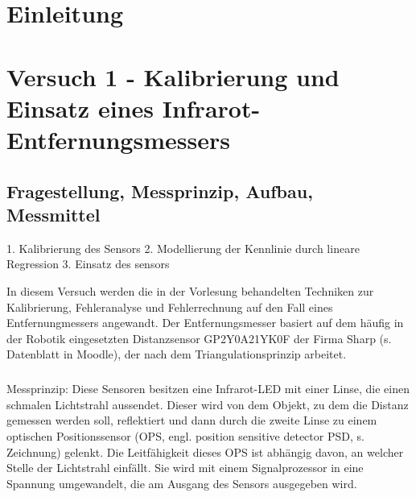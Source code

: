 \documentclass[12pt,oneside,a4paper]{report}
\begin{document}




\clearpage

%
%


%
%


%
%


%
%




\setcounter{page}{1}
%
%
\chapter{Einleitung}
\label{chap:EINL}

\cite{Franz2015j}

%
%
\chapter{Versuch 1 - Kalibrierung und Einsatz eines
Infrarot-Entfernungsmessers}
\label{chap:VERSUCH_1}

\section{Fragestellung, Messprinzip, Aufbau, Messmittel}
\label{chap:VERSUCH_1_FRAGESTELLUNG}

1.  Kalibrierung des Sensors
2. Modellierung der Kennlinie durch lineare Regression
3. Einsatz des sensors

In diesem Versuch werden die in der Vorlesung behandelten Techniken zur Kalibrierung, Fehleranalyse und Fehlerrechnung auf den Fall eines Entfernungmessers angewandt. Der Entfernungsmesser basiert auf dem häufig in der Robotik eingesetzten Distanzsensor GP2Y0A21YK0F der Firma Sharp (s. Datenblatt in Moodle), der nach dem Triangulationsprinzip arbeitet.

\paragraph{} Messprinzip: Diese Sensoren besitzen eine Infrarot-LED mit einer Linse, die einen schmalen Lichtstrahl aussendet. Dieser wird von dem Objekt, zu dem die Distanz gemessen werden soll, reflektiert und dann durch die zweite Linse zu einem optischen Positionssensor (OPS, engl. position sensitive detector PSD, s. Zeichnung) gelenkt. Die Leitfähigkeit dieses OPS ist abhängig davon, an welcher Stelle der Lichtstrahl einfällt. Sie wird mit einem Signalprozessor in eine Spannung umgewandelt, die am Ausgang des Sensors ausgegeben wird.
\end{document}
